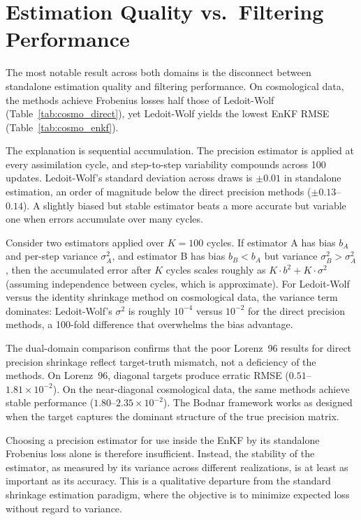 \section{Estimation Quality vs.\ Filtering Performance}
\label{sec:estimation_vs_filtering}

The most notable result across both domains is the disconnect between standalone estimation quality and filtering performance. On cosmological data, the \citep{bodnar2016direct} methods achieve Frobenius losses half those of Ledoit-Wolf (Table~\ref{tab:cosmo_direct}), yet Ledoit-Wolf yields the lowest EnKF RMSE (Table~\ref{tab:cosmo_enkf}).

The explanation is sequential accumulation. The precision estimator is applied at every assimilation cycle, and step-to-step variability compounds across 100 updates. Ledoit-Wolf's standard deviation across draws is $\pm 0.01$ in standalone estimation, an order of magnitude below the direct precision methods ($\pm 0.13$--$0.14$). A slightly biased but stable estimator beats a more accurate but variable one when errors accumulate over many cycles.

Consider two estimators applied over $K = 100$ cycles. If estimator A has bias $b_A$ and per-step variance $\sigma_A^2$, and estimator B has bias $b_B < b_A$ but variance $\sigma_B^2 > \sigma_A^2$, then the accumulated error after $K$ cycles scales roughly as $K \cdot b^2 + K \cdot \sigma^2$ (assuming independence between cycles, which is approximate). For Ledoit-Wolf versus the identity shrinkage method on cosmological data, the variance term dominates: Ledoit-Wolf's $\sigma^2$ is roughly $10^{-4}$ versus $10^{-2}$ for the direct precision methods, a 100-fold difference that overwhelms the bias advantage.

The dual-domain comparison confirms that the poor Lorenz~96 results for direct precision shrinkage reflect target-truth mismatch, not a deficiency of the methods. On Lorenz~96, diagonal targets produce erratic RMSE ($0.51$--$1.81 \times 10^{-2}$). On the near-diagonal cosmological data, the same methods achieve stable performance ($1.80$--$2.35 \times 10^{-2}$). The Bodnar framework works as designed when the target captures the dominant structure of the true precision matrix.

Choosing a precision estimator for use inside the EnKF by its standalone Frobenius loss alone is therefore insufficient. Instead, the stability of the estimator, as measured by its variance across different realizations, is at least as important as its accuracy. This is a qualitative departure from the standard shrinkage estimation paradigm, where the objective is to minimize expected loss without regard to variance.

